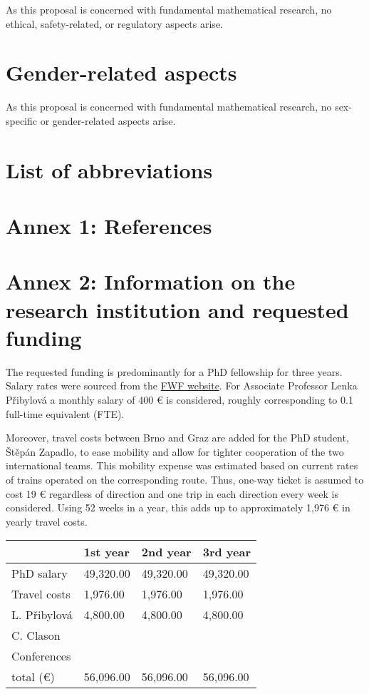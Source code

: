 \documentclass[a4paper,11pt]{scrartcl}
\begin{document}
As this proposal is concerned with fundamental mathematical research, no ethical, safety-related, or regulatory aspects arise.

\section{Gender-related aspects}\label{sec:gender}

As this proposal is concerned with fundamental mathematical research, no sex-specific or gender-related aspects arise.


\section*{List of abbreviations}

\printacronyms[heading=none, display=all]

\newpage
\section*{Annex 1: References}

\printbibliography[heading=none]

\newpage
\section*{Annex 2: Information on the research institution and requested funding}

The requested funding is predominantly for a PhD fellowship for three years. Salary rates were sourced from the \href{https://www.fwf.ac.at/en/funding/steps-to-your-fwf-project/further-information/personnel-costs}{FWF website}. For Associate Professor Lenka Přibylová a monthly salary of 400 € is considered, roughly corresponding to 0.1 full-time equivalent (FTE).

Moreover, travel costs between Brno and Graz are added for the PhD student, Štěpán Zapadlo, to ease mobility and allow for tighter cooperation of the two international teams. This mobility expense was estimated based on current rates of trains operated on the corresponding route. Thus, one-way ticket is assumed to cost 19 € regardless of direction and one trip in each direction every week is considered. Using 52 weeks in a year, this adds up to approximately 1,976 € in yearly travel costs.

\begin{table}[h!]
\centering
\begin{tabular}{l|lll}
             & 1st year  & 2nd year  & 3rd year  \\ \hline
PhD salary   & 49,320.00 & 49,320.00 & 49,320.00 \\
Travel costs & 1,976.00  & 1,976.00  & 1,976.00  \\
L. Přibylová & 4,800.00  & 4,800.00  & 4,800.00  \\
C. Clason    &           &           &           \\
Conferences  &           &           &           \\ \hline
total (€)    & 56,096.00 & 56,096.00 & 56,096.00
\end{tabular}
\end{table}
\end{document}
